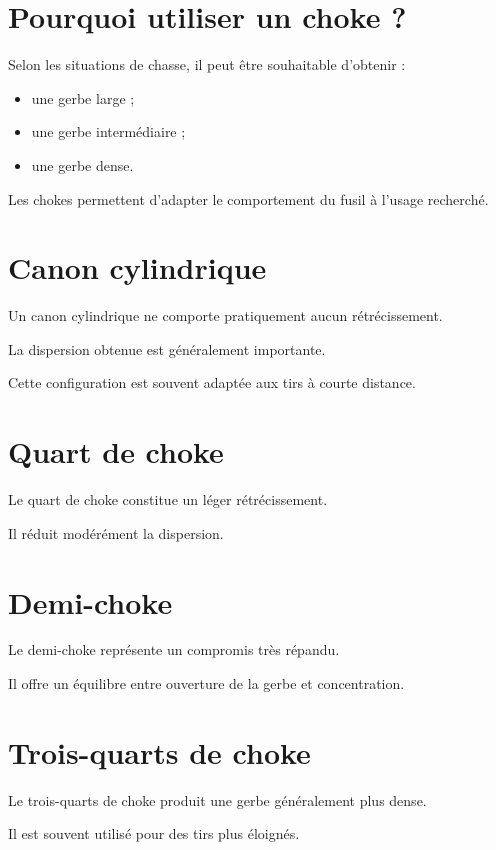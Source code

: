 \section{Pourquoi utiliser un choke ?}

Selon les situations de chasse, il peut être souhaitable d'obtenir :

\begin{itemize}
    \item une gerbe large ;
    \item une gerbe intermédiaire ;
    \item une gerbe dense.
\end{itemize}

Les chokes permettent d'adapter le comportement du fusil à l'usage recherché.

\section{Canon cylindrique}

Un canon cylindrique ne comporte pratiquement aucun rétrécissement.

La dispersion obtenue est généralement importante.

Cette configuration est souvent adaptée aux tirs à courte distance.

\section{Quart de choke}

Le quart de choke constitue un léger rétrécissement.

Il réduit modérément la dispersion.

\section{Demi-choke}

Le demi-choke représente un compromis très répandu.

Il offre un équilibre entre ouverture de la gerbe et concentration.

\section{Trois-quarts de choke}

Le trois-quarts de choke produit une gerbe généralement plus dense.

Il est souvent utilisé pour des tirs plus éloignés.

